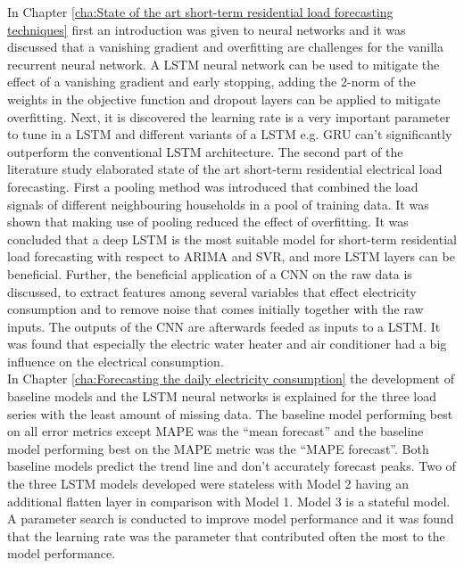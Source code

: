 In Chapter \ref{cha:State of the art short-term residential load forecasting techniques} first an introduction was given to neural networks and
it was discussed that a vanishing gradient and overfitting are challenges for the vanilla recurrent neural network. A LSTM neural network can be used to mitigate the effect of a vanishing gradient and early stopping, adding the 2-norm of the weights in the objective function and dropout layers can be applied to mitigate overfitting. Next, it is discovered the learning rate is a very important parameter to tune in a LSTM and different variants of a LSTM e.g. GRU can't significantly outperform the conventional LSTM architecture. The second part of the literature study elaborated state of the art short-term residential electrical load forecasting. First a pooling method was introduced that combined the load signals of different neighbouring households in a pool of training data. It was shown that making use of pooling reduced the effect of overfitting. It was concluded that a deep LSTM is the most suitable model for short-term residential load forecasting with respect to ARIMA and SVR, and more LSTM layers can be beneficial. Further, the beneficial application of a CNN on the raw data is discussed, to extract features among several variables that effect electricity consumption and to remove noise that comes initially together with the raw inputs. The outputs of the CNN are afterwards feeded as inputs to a LSTM. It was found that especially the electric water heater and air conditioner had a big influence on the electrical consumption.\\

In Chapter \ref{cha:Forecasting the daily electricity consumption} the development of baseline models and the LSTM neural networks is explained for the three load series with the least amount of missing data. The baseline model performing best on all error metrics except MAPE was the ``mean forecast'' and the baseline model performing best on the MAPE metric was the ``MAPE forecast''. Both baseline models predict the trend line and don't accurately forecast peaks. Two of the three LSTM models developed were stateless with Model 2 having an additional flatten layer in comparison with Model 1. Model 3 is a stateful model. A parameter search is conducted to improve model performance and it was found that the learning rate was the parameter that contributed often the most to the model performance.\\

